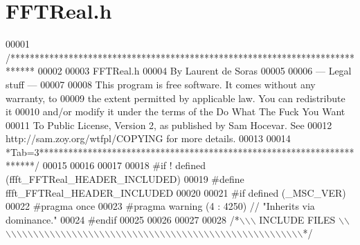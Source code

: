 \hypertarget{a00095_source}{\section{F\+F\+T\+Real.\+h}
\label{a00095_source}
}

\begin{DoxyCode}
00001 \textcolor{comment}{/*****************************************************************************}
00002 \textcolor{comment}{}
00003 \textcolor{comment}{        FFTReal.h}
00004 \textcolor{comment}{        By Laurent de Soras}
00005 \textcolor{comment}{}
00006 \textcolor{comment}{--- Legal stuff ---}
00007 \textcolor{comment}{}
00008 \textcolor{comment}{This program is free software. It comes without any warranty, to}
00009 \textcolor{comment}{the extent permitted by applicable law. You can redistribute it}
00010 \textcolor{comment}{and/or modify it under the terms of the Do What The Fuck You Want}
00011 \textcolor{comment}{To Public License, Version 2, as published by Sam Hocevar. See}
00012 \textcolor{comment}{http://sam.zoy.org/wtfpl/COPYING for more details.}
00013 \textcolor{comment}{}
00014 \textcolor{comment}{*Tab=3***********************************************************************/}
00015 
00016 
00017 
00018 \textcolor{preprocessor}{#if ! defined (ffft\_FFTReal\_HEADER\_INCLUDED)}
00019 \textcolor{preprocessor}{#define ffft\_FFTReal\_HEADER\_INCLUDED}
00020 
00021 \textcolor{preprocessor}{#if defined (\_MSC\_VER)}
00022 \textcolor{preprocessor}{    #pragma once}
00023 \textcolor{preprocessor}{    #pragma warning (4 : 4250) // "Inherits via dominance."}
00024 \textcolor{preprocessor}{#endif}
00025 
00026 
00027 
00028 \textcolor{comment}{/*\(\backslash\)\(\backslash\)\(\backslash\) INCLUDE FILES \(\backslash\)\(\backslash\)\(\backslash\)\(\backslash\)\(\backslash\)\(\backslash\)\(\backslash\)\(\backslash\)\(\backslash\)\(\backslash\)\(\backslash\)\(\backslash\)\(\backslash\)\(\backslash\)\(\backslash\)\(\backslash\)\(\backslash\)\(\backslash\)\(\backslash\)\(\backslash\)\(\backslash\)\(\backslash\)\(\backslash\)\(\backslash\)\(\backslash\)\(\backslash\)\(\backslash\)\(\backslash\)\(\backslash\)\(\backslash\)\(\backslash\)\(\backslash\)\(\backslash\)\(\backslash\)\(\backslash\)\(\backslash\)\(\backslash\)\(\backslash\)\(\backslash\)\(\backslash\)\(\backslash\)\(\backslash\)\(\backslash\)\(\backslash\)\(\backslash\)\(\backslash\)\(\backslash\)\(\backslash\)\(\backslash\)\(\backslash\)\(\backslash\)\(\backslash\)\(\backslash\)\(\backslash\)\(\backslash\)\(\backslash\)*/}

\end{DoxyCode}
